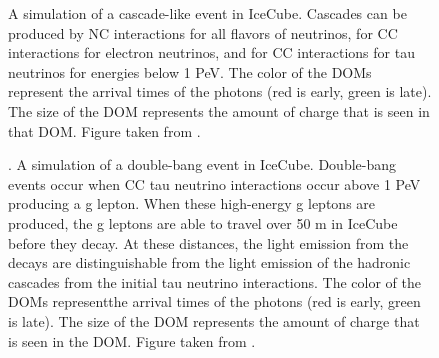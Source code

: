 \begin{figure}
    \caption{ A simulation of a cascade-like event in IceCube. Cascades can be produced by NC interactions for all flavors of neutrinos, for CC interactions for electron neutrinos, and for CC interactions for tau neutrinos for energies below 1 PeV. The color of the DOMs represent the arrival times of the photons (red is early, green is late). The size of the DOM represents the amount of charge that is seen in that DOM. Figure taken from \cite{IC3_masterclass}.}
    \label{fig:ic3_cascade}
\end{figure}

\begin{figure}
    \caption{. A simulation of a double-bang event in IceCube. Double-bang events occur when CC tau neutrino interactions occur above 1 PeV producing a g lepton. When these high-energy g leptons are produced, the g leptons are able to travel over 50 m in IceCube before they decay. At these distances, the light emission from the decays are distinguishable from the light emission of the hadronic cascades from the initial tau neutrino interactions. The color of the DOMs representthe arrival times of the photons (red is early, green is late). The size of the DOM represents the amount of charge that is seen in the DOM. Figure taken from \cite{IC3_masterclass}.}
    \label{fig:ic3_doubleBang}
\end{figure}

